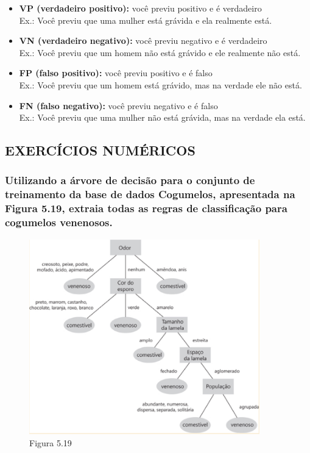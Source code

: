 \documentclass{article}
\begin{document}
\begin{itemize}
  \item \textbf{VP (verdadeiro positivo):} você previu positivo e é verdadeiro \\ Ex.: Você previu que uma mulher está grávida e ela realmente está.
  \item \textbf{VN (verdadeiro negativo):} você previu negativo e é verdadeiro \\ Ex.: Você previu que um homem não está grávido e ele realmente não está.
  \item \textbf{FP (falso positivo):} você previu positivo e é falso \\ Ex.: Você previu que um homem está grávido, mas na verdade ele não está.
  \item \textbf{FN (falso negativo):} você previu negativo e é falso \\ Ex.: Você previu que uma mulher não está grávida, mas na verdade ela está.
\end{itemize}
\newpage

\subsection{EXERCÍCIOS NUMÉRICOS}

\subsubsection{Utilizando a árvore de decisão para o conjunto de treinamento da base de dados Cogumelos, apresentada na Figura 5.19, extraia todas as regras de classificação para cogumelos venenosos.}
\begin{figure}[H]
  \centering 
  \includegraphics[width=10cm]{Figura-5-19.png} 
  \caption*{Figura 5.19}
\end{figure}
\end{document}
